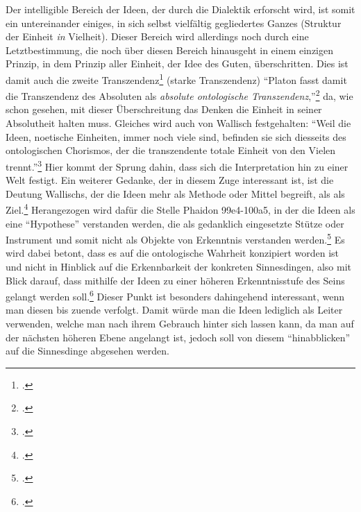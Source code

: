 Der intelligible Bereich der Ideen, der durch die Dialektik erforscht wird, ist somit ein untereinander einiges, in sich selbst vielfältig gegliedertes Ganzes (Struktur der Einheit \emph{in} Vielheit). Dieser Bereich wird allerdings noch durch eine Letztbestimmung, die noch über diesen Bereich hinausgeht in einem einzigen Prinzip, in dem Prinzip aller Einheit, der Idee des Guten, überschritten. Dies ist damit auch die zweite Transzendenz\footcite[vgl.][S. 223f.]{halfwassenaufstieg2006} (starke Transzendenz)
\enquote{Platon fasst damit die Transzendenz des Absoluten als \emph{absolute ontologische Transzendenz},}\footcite[][S. 224]{halfwassenaufstieg2006} da, wie schon gesehen, mit dieser Überschreitung das Denken die Einheit in seiner Absolutheit halten muss. Gleiches wird auch von Wallisch festgehalten: \enquote{Weil die Ideen, noetische Einheiten, immer noch viele sind, befinden sie sich diesseits des ontologischen Chorismos, der die transzendente totale Einheit von den Vielen trennt.}\footcite[][S. 17]{Wallisch}
Hier kommt der Sprung dahin, dass sich die Interpretation hin zu einer Welt festigt. 
Ein weiterer Gedanke, der in diesem Zuge interessant ist, ist die Deutung Wallischs, der 
die Ideen mehr als Methode oder Mittel begreift, als als Ziel.\footcite[vgl.][S. 26]{Wallisch} Herangezogen wird dafür die Stelle Phaidon 99e4-100a5, in der die Ideen als eine \enquote{Hypothese} verstanden werden, die als gedanklich eingesetzte Stütze oder Instrument und somit nicht als Objekte von Erkenntnis verstanden werden.\footcite[vgl.][S. 26]{Wallisch} Es wird dabei betont, dass es auf die ontologische Wahrheit konzipiert worden ist und nicht in Hinblick auf die Erkennbarkeit der konkreten Sinnesdingen, also mit Blick darauf, dass mithilfe der Ideen zu einer höheren Erkenntnisstufe des Seins gelangt werden soll.\footcite[vgl.][S. 27]{Wallisch}
Dieser Punkt ist besonders dahingehend interessant, wenn man diesen bis zuende verfolgt. Damit würde man die Ideen lediglich als Leiter verwenden, welche man nach ihrem Gebrauch hinter sich lassen kann, da man auf der nächsten höheren Ebene angelangt ist, jedoch soll von diesem \enquote{hinabblicken} auf die Sinnesdinge abgesehen werden. 
